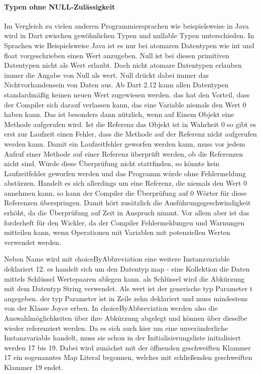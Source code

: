 \paragraph{Typen ohne NULL-Zulässigkeit} Im Vergleich zu vielen anderen Programmiersprachen wie beispielsweise in Java wird in Dart zwischen gewöhnlichen Typen und nullable Typen unterschieden. In Sprachen wie Beispielsweise Java ist es nur bei atomaren Datentypen wie int und float vorgeschrieben einen Wert anzugeben. Null ist bei diesen primitiven Datentypen nicht als Wert erlaubt. Doch nicht atomare Datentypen erlauben immer die Angabe von Null als wert. Null drückt dabei immer das Nichtvorhandensein von Daten aus. Ab Dart 2.12   kann allen Datentypen standardmäßig keinen neuen Wert zugewiesen werden.  das hat den Vorteil, dass der Compiler sich darauf verlassen kann, das eine Variable niemals den Wert 0 haben kann. Das ist besonders dann nützlich, wenn auf  Einem Objekt eine Methode aufgerufen wird. Ist die Referenz das Objekt ist in Wahrheit 0 so gibt es erst zur Laufzeit einen Fehler, dass die Methode auf der Referenz nicht aufgerufen werden kann. Damit  ein Laufzeitfehler geworfen werden kann, muss vor jedem Aufruf einer Methode auf einer Referenz überprüft werden, ob die Referenzen nicht  sind. Würde diese Überprüfung nicht stattfinden, so  könnte kein Laufzeitfehler geworfen werden und das Programm würde ohne Fehlermeldung abstürzen. Handelt es sich allerdings um eine Referenz, die niemals den Wert 0 annehmen kann, so kann der Compiler die Überprüfung auf 0 Wörter für diese Referenzen überspringen. Damit hört zusätzlich die Ausführungsgeschwindigkeit erhöht, da die  Überprüfung auf Zeit in Anspruch nimmt. Vor allem aber ist das forderheft für den Wickler, da der Compiler  Fehlermeldungen und Warnungen mitteilen kann, wenn  Operationen  mit Variablen mit potenziellen   Werten verwendet werden.

Neben Name wird mit  choiceByAbbreviation eine weitere Instanzvariable deklariert 12.
es handelt sich um den Datentyp map -  eine Kollektion die Daten mittels Schlüssel Wertepaaren ablegen kann.   als Schlüssel wird  die Abkürzung mit dem Datentyp String verwendet. Als wert ist der  generische typ Parameter t angegeben.  der typ Parameter ist in Zeile zehn deklariert und muss  mindestens von der Klasse Joyce erben. In choiceByAbbreviation werden also die Auswahlmöglichkeiten über  ihre Abkürzung abgelegt und können über dieselbe wieder referenziert werden.  Da es sich auch hier um eine unveränderliche Instanzvariable handelt, muss sie schon in der Initialisierungsliste initialisiert werden 17 bis 19. Dabei wird zunächst mit der öffnenden geschweiften Klammer 17 ein sogenanntes Map Literal begonnen, welches mit  schließenden geschweiften Klammer 19 endet.

